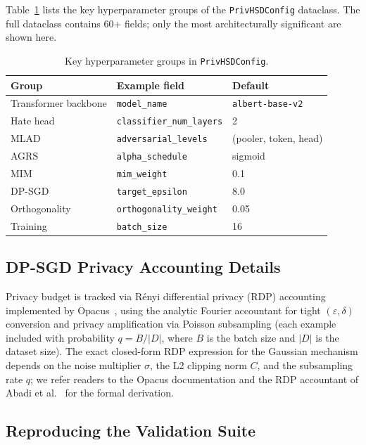 \documentclass{article}
\begin{document}
Table~\ref{tab:config} lists the key hyperparameter groups of the
\texttt{PrivHSDConfig} dataclass. The full dataclass contains 60+
fields; only the most architecturally significant are shown here.

\begin{table}[h]
  \centering
  \caption{Key hyperparameter groups in \texttt{PrivHSDConfig}.}
  \label{tab:config}
  \begin{tabular}{lll}
    \toprule
    \textbf{Group} & \textbf{Example field} & \textbf{Default} \\
    \midrule
    Transformer backbone & \texttt{model\_name} & \texttt{albert-base-v2} \\
    Hate head & \texttt{classifier\_num\_layers} & 2 \\
    MLAD & \texttt{adversarial\_levels} & (pooler, token, head) \\
    AGRS & \texttt{alpha\_schedule} & sigmoid \\
    MIM & \texttt{mim\_weight} & 0.1 \\
    DP-SGD & \texttt{target\_epsilon} & 8.0 \\
    Orthogonality & \texttt{orthogonality\_weight} & 0.05 \\
    Training & \texttt{batch\_size} & 16 \\
    \bottomrule
  \end{tabular}
\end{table}

\subsection{DP-SGD Privacy Accounting Details}

Privacy budget is tracked via R\'enyi differential privacy (RDP)
accounting implemented by Opacus~\cite{yousefpour2021opacus}, using
the analytic Fourier accountant for tight
$(\varepsilon,\delta)$ conversion and privacy amplification via
Poisson subsampling (each example included with probability
$q = B / |D|$, where $B$ is the batch size and $|D|$ is the dataset
size). The exact closed-form RDP expression for the Gaussian
mechanism depends on the noise multiplier $\sigma$, the L2 clipping
norm $C$, and the subsampling rate $q$; we refer readers to the
Opacus documentation and the RDP accountant of
Abadi et al.~\cite{abadi2016deep} for the formal derivation.

\subsection{Reproducing the Validation Suite}
\end{document}
